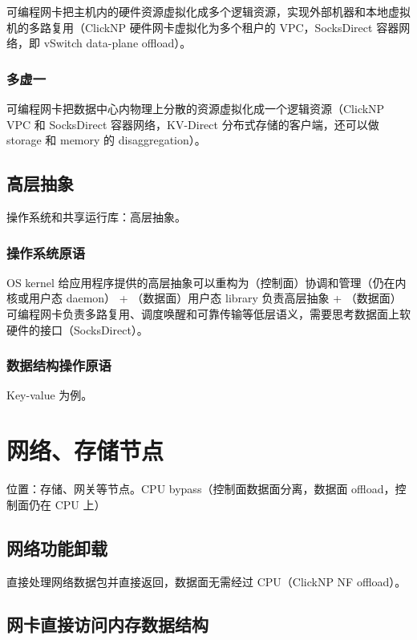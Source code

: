 可编程网卡把主机内的硬件资源虚拟化成多个逻辑资源，实现外部机器和本地虚拟机的多路复用（ClickNP 硬件网卡虚拟化为多个租户的 VPC，SocksDirect 容器网络，即 vSwitch data-plane offload）。

\subsubsection{多虚一}

可编程网卡把数据中心内物理上分散的资源虚拟化成一个逻辑资源（ClickNP VPC 和 SocksDirect 容器网络，KV-Direct 分布式存储的客户端，还可以做 storage 和 memory 的 disaggregation）。

\subsection{高层抽象}

操作系统和共享运行库：高层抽象。

\subsubsection{操作系统原语}

OS kernel 给应用程序提供的高层抽象可以重构为（控制面）协调和管理（仍在内核或用户态 daemon） + （数据面）用户态 library 负责高层抽象 + （数据面）可编程网卡负责多路复用、调度唤醒和可靠传输等低层语义，需要思考数据面上软硬件的接口（SocksDirect）。

\subsubsection{数据结构操作原语}

Key-value 为例。

\section{网络、存储节点}

位置：存储、网关等节点。CPU bypass（控制面数据面分离，数据面 offload，控制面仍在 CPU 上）

\subsection{网络功能卸载}

直接处理网络数据包并直接返回，数据面无需经过 CPU（ClickNP NF offload）。

\subsection{网卡直接访问内存数据结构}

